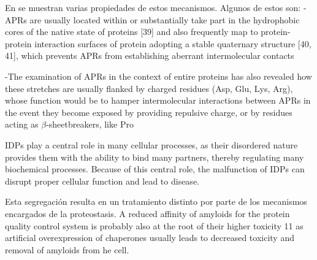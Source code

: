 En \cite{knowles2014amyloid} se muestran varias propiedades de estos mecanismos. 
Algunos de estos son:
-APRs are usually located within or substantially take part in the hydrophobic cores of the native state of proteins [39] and also frequently map to protein-protein interaction surfaces of protein adopting
a stable quaternary structure [40, 41], which prevents APRs from establishing aberrant intermolecular contacts

-The examination of APRs in the context of entire proteins has also revealed how these stretches are usually flanked by charged residues (Asp, Glu, Lys, Arg), whose
function would be to hamper intermolecular interactions between APRs in the event they become exposed by providing repulsive charge, or by residues acting as $\beta$-sheetbreakers, like Pro


IDPs play a central role in many cellular processes, as their disordered nature provides them with the ability to bind many partners, thereby regulating many biochemical
processes. Because of this central role, the malfunction of IDPs can disrupt proper cellular function and lead to disease.


Esta segregación resulta en un tratamiento distinto por parte de los mecanismos encargados de la proteostasis.
A reduced affinity of amyloids for the protein quality control system is probably also at the root of their higher toxicity 11 as artificial overexpression of chaperones
usually leads to decreased toxicity and removal of amyloids from he cell.





